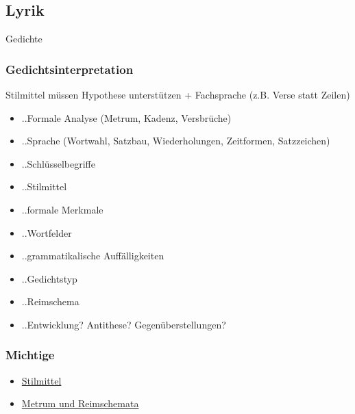

\subsection{Lyrik}

 Gedichte


\subsubsection{Gedichtsinterpretation}

 Stilmittel müssen Hypothese unterstützen + Fachsprache (z.B. Verse statt Zeilen)

\begin{itemize}
    \item ..Formale Analyse (Metrum, Kadenz, Versbrüche)
    \item ..Sprache (Wortwahl, Satzbau, Wiederholungen, Zeitformen, Satzzeichen)
    \item ..Schlüsselbegriffe 
    \item ..Stilmittel
    \item ..formale Merkmale
    \item ..Wortfelder
    \item ..grammatikalische Auffälligkeiten
    \item ..Gedichtstyp
    \item ..Reimschema
    \item ..Entwicklung? Antithese? Gegenüberstellungen?
\end{itemize}


\subsubsection{Michtige}
\begin{itemize}
    \item \hyperref[sec:stilmittel]{Stilmittel}
    \item \hyperref[sec:metrum]{Metrum und Reimschemata}
\end{itemize}
